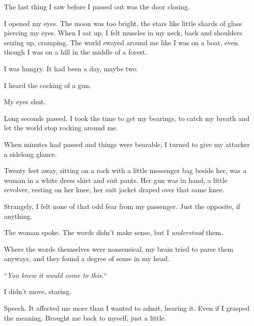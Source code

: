The last thing I saw before I passed out was the door closing.



\sectionbreak



I opened my eyes.  The moon was too bright, the stars like little shards of glass piercing my eyes.  When I sat up, I felt muscles in my neck, back and shoulders seizing up, cramping.  The world swayed around me like I was on a boat, even though I was on a hill in the middle of a forest.



I was hungry.  It had been a day, maybe two.



I heard the cocking of a gun.



My eyes shut.



Long seconds passed.  I took the time to get my bearings, to catch my breath and let the world stop rocking around me.



When minutes had passed and things were bearable, I turned to give my attacker a sidelong glance.



Twenty feet away, sitting on a rock with a little messenger bag beside her, was a woman in a white dress shirt and suit pants.  Her gun was in hand, a little revolver, resting on her knee, her suit jacket draped over that same knee.



Strangely, I felt none of that odd fear from my passenger.  Just the opposite, if anything.



The woman spoke.  The words didn't make sense, but I \emph{understood} them\emph{.  }



Where the words themselves were nonsensical, my brain tried to parse them anyways, and they found a degree of sense in my head.



``\emph{You knew it would come to this.}``



I didn't move, staring.



Speech.  It affected me more than I wanted to admit, hearing it.  Even if I grasped the meaning.  Brought me back to myself, just a little.



